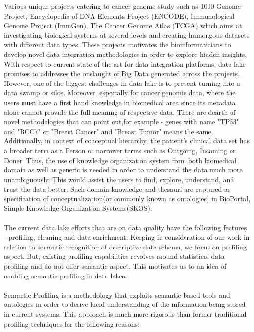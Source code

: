 Various unique projects catering to cancer genome study such as 1000 Genome Project\cite{10002010map}\cite{10002012integrated}, Encyclopedia of DNA Elements Project (ENCODE)\cite{ecker2012genomics}, Immunological Genome Project (ImmGen)\cite{shay2013immunological}, The Cancer Genome Atlas (TCGA)\cite{lee2016exploring} which aims at investigating biological systems at several levels and creating humongous datasets with different data types. These projects motivates the bioinformaticians to develop novel data integration methodologies in order to explore hidden insights. With respect to current state-of-the-art for data integration platforms, data lake promises to addresses the onslaught of Big Data generated across the projects. However, one of the biggest challenges in data lake is to prevent turning into a data swamp or silos. Moreover, especially for cancer genomic data, where the users must have a first hand knowledge in biomedical area since its metadata alone cannot provide the full meaning of respective data. There are dearth of novel methodologies that can point out,for example - genes with name "TP53" and "BCC7" or "Breast Cancer" and "Breast Tumor" means the same. Additionally, in context of conceptual hierarchy, the patient's clinical data set has a broader term as a Person or narrower terms such as Outgoing, Incoming or Doner.  Thus, the use of knowledge organization system from both biomedical domain as well as generic is needed in order to understand the data much more unambiguously.  This would assist the users to find, explore, understand, and trust the data better. Such domain knowledge and thesauri are captured as specification of conceptualization(or commonly known as ontologies) in BioPortal\cite{noy2009bioportal}, Simple Knowledge Organization Systems(SKOS)\cite{miles2005skos}. \\~\\
The current data lake efforts that are on data quality have the following features - profiling, cleaning and data enrichment. Keeping in consideration of our work in relation to semantic recognition of descriptive data schema, we focus on profiling aspect. But, existing profiling capabilities revolves around statistical data profiling and do not offer semantic aspect. This motivates us to an idea of enabling semantic profiling in data lakes. \\~\\
Semantic Profiling is a methodology that exploits semantic-based tools and ontologies in order to derive lucid understanding of the information being stored in current systems. This approach is much more rigorous than former traditional profiling techniques for the following reasons: \\
